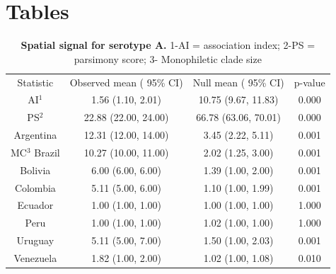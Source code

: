 \documentclass[10pt]{article}
\begin{document}
\section*{Tables}
\begin{table}[!ht]
\caption{
\textbf{Spatial signal for serotype A.} 1-AI = association index; 2-PS = parsimony score; 3- Monophiletic clade size}
\begin{tabular}{c|c|c|c}
Statistic &	Observed mean ( 95\% CI)&	Null mean ( 95\% CI)&	p-value\\
AI$^1$	&1.56 (1.10, 2.01)& 10.75 (9.67, 11.83) &0.000\\
PS$^2$	&22.88 (22.00, 24.00)	&66.78	(63.06, 70.01)	&0.000\\
Argentina &12.31 (12.00, 14.00)	&3.45	(2.22, 5.11)	&0.001\\
MC$^3$ Brazil &10.27	(10.00, 11.00)	&2.02 (1.25, 3.00) &0.001\\
Bolivia &6.00 (6.00, 6.00)	&1.39 (1.00, 2.00)	&0.001\\
Colombia &5.11 (5.00, 6.00)	&1.10  (1.00, 1.99)	&0.001\\
Ecuador &1.00 (1.00, 1.00)	&1.00 (1.00, 1.00)	&1.000\\
Peru&1.00 (1.00, 1.00)	&1.02 (1.00, 1.00)	&1.000\\
Uruguay &5.11 (5.00, 7.00)	&1.50	(1.00, 2.03)	&0.001\\
Venezuela&1.82 (1.00, 2.00)	&1.02 (1.00, 1.08)	&0.010\\
\end{tabular}
\begin{flushleft}
\end{flushleft}
\label{tab:BaTSA}
 \end{table}
\end{document}
